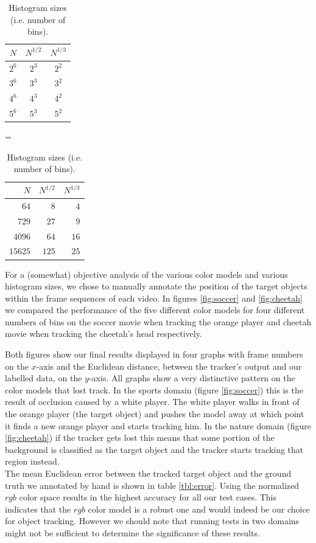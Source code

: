 \documentclass[11pt]{article}
\begin{document}
\begin{table}[!ht]
\centering
\begin{tabular}{c|c|c}
$N$   & $N^{1/2}$ & $N^{1/3}$\\\hline\hline
$2^6$ & $2^3$     & $2^2$\\\hline
$3^6$ & $3^3$     & $3^2$\\\hline
$4^6$ & $4^3$     & $4^2$\\\hline
$5^6$ & $5^3$     & $5^2$\\
\end{tabular}
=
\begin{tabular}{r|r|r}
$N$     & $N^{1/2}$ & $N^{1/3}$\\\hline\hline
$64$    & $8$       & $4$\\\hline
$729$   & $27$      & $9$\\\hline
$4096$  & $64$      & $16$\\\hline
$15625$ & $125$     & $25$\\
\end{tabular}
\caption{Histogram sizes (i.e. number of bins).}
\label{tbl:bins}
\end{table}

For a (somewhat) objective analysis of the various color models and various
histogram sizes, we chose to manually annotate the position of the target
objects within the frame sequences of each video. In figures \ref{fig:soccer}
and \ref{fig:cheetah} we compared the performance of
the five different color models for four different numbers of bins on the soccer
movie when tracking the orange player and cheetah movie when tracking the
cheetah's head respectively.

Both figures show our final results displayed in
four graphs with frame numbers on the $x$-axis and the Euclidean distance,
between the tracker's output and our labelled data, on the $y$-axis. All graphs
show a very distinctive pattern on the color models that lost track. In the
sports domain (figure \ref{fig:soccer}) this is the result of occlusion caused by
a white player. The white player walks in front of the orange player (the
target object) and pushes the model away at which point it finds a new orange
player and starts tracking him. In the nature domain (figure \ref{fig:cheetah})
if the tracker gets lost this means that some portion of the background is
classified as the target object and the tracker starts tracking that region
instead.\\

The mean Euclidean error between the tracked target object and the ground truth
we annotated by hand is shown in table \ref{tbl:error}. Using the normalized
$rgb$ color space results in the highest accuracy for all our test cases.
This indicates that the $rgb$ color model is a robust one and would indeed be
our choice for object tracking. However we should note that running tests in two
domains might not be sufficient to determine the significance of these results.
\end{document}
